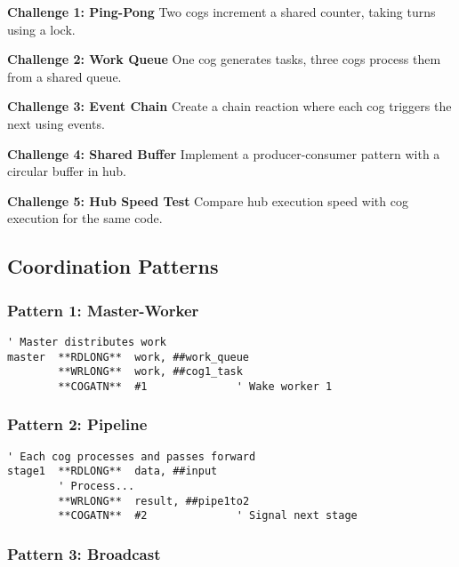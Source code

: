 \documentclass[11pt]{book}
\begin{document}
\begin{yourturn}
\textbf{Challenge 1: Ping-Pong}
Two cogs increment a shared counter, taking turns using a lock.

\textbf{Challenge 2: Work Queue}
One cog generates tasks, three cogs process them from a shared queue.

\textbf{Challenge 3: Event Chain}
Create a chain reaction where each cog triggers the next using events.

\textbf{Challenge 4: Shared Buffer}
Implement a producer-consumer pattern with a circular buffer in hub.

\textbf{Challenge 5: Hub Speed Test}
Compare hub execution speed with cog execution for the same code.
\end{yourturn}

\hypertarget{coordination-patterns}{%
\subsection{Coordination Patterns}\label{coordination-patterns}}

\hypertarget{pattern-1-master-worker}{%
\subsubsection{Pattern 1: Master-Worker}\label{pattern-1-master-worker}}

\begin{lstlisting}
' Master distributes work
master  **RDLONG**  work, ##work_queue
        **WRLONG**  work, ##cog1_task
        **COGATN**  #1              ' Wake worker 1
\end{lstlisting}

\hypertarget{pattern-2-pipeline}{%
\subsubsection{Pattern 2: Pipeline}\label{pattern-2-pipeline}}

\begin{lstlisting}
' Each cog processes and passes forward
stage1  **RDLONG**  data, ##input
        ' Process...
        **WRLONG**  result, ##pipe1to2
        **COGATN**  #2              ' Signal next stage
\end{lstlisting}

\hypertarget{pattern-3-broadcast}{%
\subsubsection{Pattern 3: Broadcast}\label{pattern-3-broadcast}}
\end{document}
